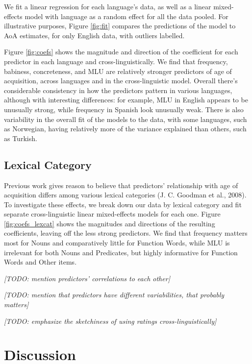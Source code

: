 \documentclass[10pt, letterpaper]{article}
\begin{document}
We fit a linear regression for each language's data, as well as a linear
mixed-effects model with language as a random effect for all the data
pooled. For illustrative purposes, Figure \ref{fig:fit} compares the
predictions of the model to AoA estimates, for only English data, with
outliers labelled.

Figure \ref{fig:coefs} shows the magnitude and direction of the
coefficient for each predictor in each language and
cross-linguistically. We find that frequency, babiness, concreteness,
and MLU are relatively stronger predictors of age of acquisition, across
languages and in the cross-linguistic model. Overall there's
considerable consistency in how the predictors pattern in various
languages, although with interesting differences: for example, MLU in
English appears to be unusually strong, while frequency in Spanish look
unusually weak. There is also variability in the overall fit of the
models to the data, with some languages, such as Norwegian, having
relatively more of the variance explained than others, such as Turkish.

\subsection{Lexical Category}\label{lexical-category}

Previous work gives reason to believe that predictors' relationship with
age of acquisition differs among various lexical categories (J. C.
Goodman et al., 2008). To investigate these effects, we break down our
data by lexical category and fit separate cross-linguistic linear
mixed-effects models for each one. Figure \ref{fig:coefs_lexcat} shows
the magnitudes and directions of the resulting coefficients, leaving off
the less strong predictors. We find that frequency matters most for
Nouns and comparatively little for Function Words, while MLU is
irrelevant for both Nouns and Predicates, but highly informative for
Function Words and Other items.

\emph{{[}TODO: mention predictors' correlations to each other{]}}

\emph{{[}TODO: mention that predictors have different variabilities,
that probably matters{]}}

\emph{{[}TODO: emphasize the sketchiness of using ratings
cross-linguistically{]}}

\section{Discussion}\label{discussion}
\end{document}
